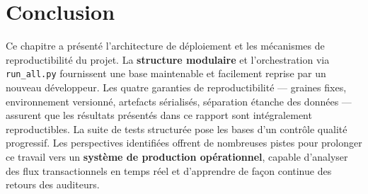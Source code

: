 \section*{Conclusion}

Ce chapitre a présenté l'architecture de déploiement et les mécanismes de reproductibilité
du projet. La \textbf{structure modulaire} et l'orchestration via \texttt{run\_all.py}
fournissent une base maintenable et facilement reprise par un nouveau développeur. Les
quatre garanties de reproductibilité --- graines fixes, environnement versionné, artefacts
sérialisés, séparation étanche des données --- assurent que les résultats présentés dans
ce rapport sont intégralement reproductibles. La suite de tests structurée pose les bases
d'un contrôle qualité progressif. Les perspectives identifiées offrent de nombreuses pistes
pour prolonger ce travail vers un \textbf{système de production opérationnel}, capable
d'analyser des flux transactionnels en temps réel et d'apprendre de façon continue
des retours des auditeurs.
